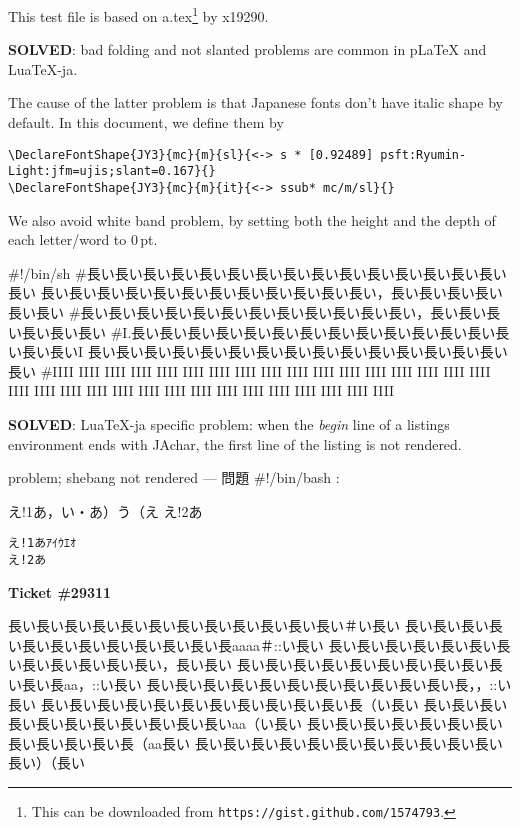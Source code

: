 \documentclass{article}
\begin{document}
This test file is based on a.tex\footnote{This can be downloaded from {\tt https://gist.github.com/1574793}.} by x19290.


\textbf{SOLVED}: bad folding and not slanted problems are common in pLaTeX and LuaTeX-ja.

The cause of the latter problem is that Japanese fonts don't have italic shape by default.
In this document, we define them by
\begin{lstlisting}[language={[AlLaTeX]TeX}, basicstyle=\ttfamily]
\DeclareFontShape{JY3}{mc}{m}{sl}{<-> s * [0.92489] psft:Ryumin-Light:jfm=ujis;slant=0.167}{}
\DeclareFontShape{JY3}{mc}{m}{it}{<-> ssub* mc/m/sl}{}
\end{lstlisting}
\newpage

We also avoid white band problem, by setting both the height and the depth of each 
letter/word to 0\,pt. 

\begin{env}{\relax}
#!/bin/sh
#長い長い長い長い長い長い長い長い長い長い長い長い長い長い長い長い
長い長い長い長い長い長い長い長い長い長い長い長い，長い長い長い長い長い長い
#長い長い長い長い長い長い長い長い長い長い長い長い，長い長い長い長い長い長い
#I.長い長い長い長い長い長い長い長い長い長い長い長い長い長い長い長いI
長い長い長い長い長い長い長い長い長い長い長い長い長い長い長い長い
#IIII IIII IIII IIII IIII IIII IIII IIII IIII IIII IIII IIII IIII IIII IIII IIII
IIII IIII IIII IIII IIII IIII IIII IIII IIII IIII IIII IIII IIII IIII IIII IIII
\end{env}

\newpage

\textbf{SOLVED}: LuaTeX-ja specific problem:
when the \emph{begin} line of a listings environment ends with JAchar,
the first line of the listing is not rendered.

\begin{env}{problem; shebang not rendered --- 問題}
#!/bin/bash
:
\end{env}

\begin{LTXexample}[language=TeX]
え!1あ，い・あ）う（え
え!2あ
\end{LTXexample}



\begin{lstlisting}
え!1あｱｲｳｴｵ
え!2あ
\end{lstlisting}
\newpage
\textbf{Ticket \#29311}

\begin{env}{\relax}
長い長い長い長い長い長い長い長い長い長い長い長い＃い長い
長い長い長い長い長い長い長い長い長い長い長い長aaaa＃::い長い
長い長い長い長い長い長い長い長い長い長い長い長い，長い長い
長い長い長い長い長い長い長い長い長い長い長い長aa，::い長い
長い長い長い長い長い長い長い長い長い長い長い長，，::い長い
長い長い長い長い長い長い長い長い長い長い長い長（い長い
長い長い長い長い長い長い長い長い長い長い長いaa（い長い
長い長い長い長い長い長い長い長い長い長い長い長（aa長い
長い長い長い長い長い長い長い長い長い長い長い長い）（長い
\end{env}
\end{document}
